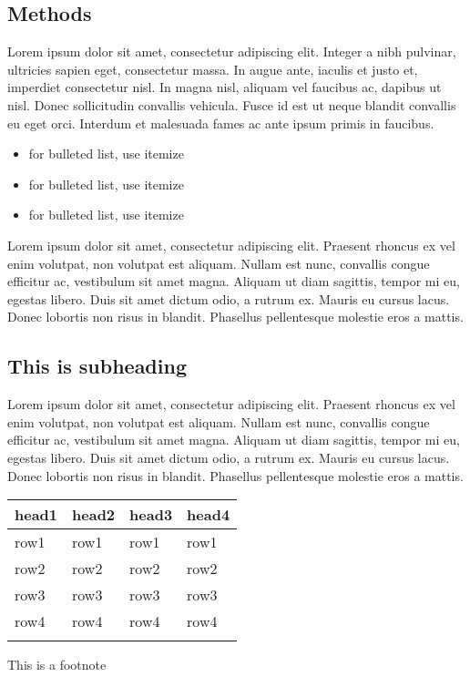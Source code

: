 \documentclass{bioinfo}
\begin{document}
\begin{methods}
\section{Methods}

Lorem ipsum dolor sit amet, consectetur adipiscing elit. Integer a 
nibh pulvinar, ultricies sapien eget, consectetur massa. In augue 
ante, iaculis et justo et, imperdiet consectetur nisl. In magna 
nisl, aliquam vel faucibus ac, dapibus ut nisl. Donec sollicitudin 
convallis vehicula. Fusce id est ut neque blandit convallis eu eget 
orci. Interdum et malesuada fames ac ante ipsum primis in faucibus. 

\begin{itemize}
\item for bulleted list, use itemize
\item for bulleted list, use itemize
\item for bulleted list, use itemize\vspace*{1pt}
\end{itemize}

Lorem ipsum dolor sit amet, consectetur adipiscing elit. Praesent 
rhoncus ex vel enim volutpat, non volutpat est aliquam. Nullam est 
nunc, convallis congue efficitur ac, vestibulum sit amet magna. 
Aliquam ut diam sagittis, tempor mi eu, egestas libero. Duis sit 
amet dictum odio, a rutrum ex. Mauris eu cursus lacus. Donec 
lobortis non risus in blandit. Phasellus pellentesque molestie 
eros a mattis. 

\subsection{This is subheading}

Lorem ipsum dolor sit amet, consectetur adipiscing elit. Praesent 
rhoncus ex vel enim volutpat, non volutpat est aliquam. Nullam est 
nunc, convallis congue efficitur ac, vestibulum sit amet magna. 
Aliquam ut diam sagittis, tempor mi eu, egestas libero. Duis sit 
amet dictum odio, a rutrum ex. Mauris eu cursus lacus. Donec 
lobortis non risus in blandit. Phasellus pellentesque molestie 
eros a mattis. 

\begin{table}[!t]
 {\begin{tabular}{@{}llll@{}}\toprule head1 &
head2 & head3 & head4\\\midrule
row1 & row1 & row1 & row1\\
row2 & row2 & row2 & row2\\
row3 & row3 & row3 & row3\\
row4 & row4 & row4 & row4\\\botrule
\end{tabular}}{This is a footnote}
\end{table}

\end{methods}
\end{document}
